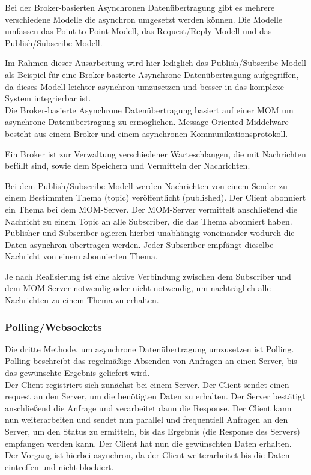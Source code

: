 Bei der Broker-basierten Asynchronen Datenübertragung gibt es mehrere verschiedene Modelle die asynchron umgesetzt werden können. Die Modelle umfassen das Point-to-Point-Modell, das Request/Reply-Modell und das Publish/Subscribe-Modell. \cite*{abts:2019,tremp:2021}

Im Rahmen dieser Ausarbeitung wird hier lediglich das Publish/Subscribe-Modell als Beispiel für eine Broker-basierte Asynchrone Datenübertragung aufgegriffen, da dieses Modell leichter asynchron umzusetzen und besser in das komplexe System integrierbar ist. \\

Die Broker-basierte Asynchrone Datenübertragung basiert auf einer \ac{MOM} um asynchrone Datenübertragung zu ermöglichen. Message Oriented Middelware besteht aus einem Broker und einem asynchronen Kommunikationsprotokoll. \cite*{tremp:2021}

Ein Broker ist zur Verwaltung verschiedener Warteschlangen, die mit Nachrichten befüllt sind, sowie dem Speichern und Vermitteln der Nachrichten. \cite*{tremp:2021}

Bei dem Publish/Subscribe-Modell werden Nachrichten von einem Sender zu einem Bestimmten Thema (topic) veröffentlicht (published). Der Client abonniert ein Thema bei dem MOM-Server. Der MOM-Server vermittelt anschließend die Nachricht zu einem Topic an alle Subscriber, die das Thema abonniert haben. \cite*{abts:2019} Publisher und Subscriber agieren hierbei unabhängig voneinander wodurch die Daten asynchron übertragen werden. Jeder Subscriber empfängt dieselbe Nachricht von einem abonnierten Thema. \cite*{tremp:2021}

Je nach Realisierung ist eine aktive Verbindung zwischen dem Subscriber und dem MOM-Server notwendig oder nicht notwendig, um nachträglich alle Nachrichten zu einem Thema zu erhalten. \cite*{abts:2019}

\subsubsection{Polling/Websockets}
Die dritte Methode, um asynchrone Datenübertragung umzusetzen ist Polling. Polling beschreibt das regelmäßige Absenden von Anfragen an einen Server, bis das gewünschte Ergebnis geliefert wird. \cite*{goll:2020} \\

Der Client registriert sich zunächst bei einem Server. Der Client sendet einen request an den Server, um die benötigten Daten zu erhalten. Der Server bestätigt anschließend die Anfrage und verarbeitet dann die Response. \cite*{goll:2020} Der Client kann nun weiterarbeiten und sendet nun parallel und frequentiell Anfragen an den Server, um den Status zu ermitteln, bis das Ergebnis (die Response des Servers) empfangen werden kann. Der Client hat nun die gewünschten Daten erhalten. Der Vorgang ist hierbei asynchron, da der Client weiterarbeitet bis die Daten eintreffen und nicht blockiert. \\

